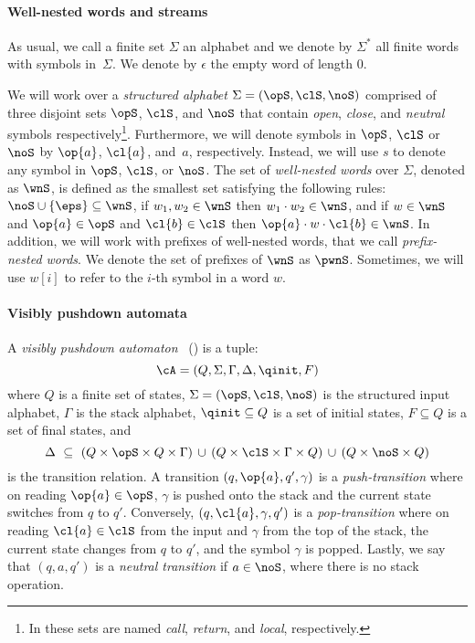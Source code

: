 \paragraph{Well-nested words and streams} As usual, we call a finite set $\Sigma$ an alphabet and we denote by $\Sigma^*$ all finite words with symbols in~$\Sigma$.  We denote by $\epsilon$ the empty word of length $0$.

We will work over a {\em structured alphabet} $\Sigma = (\opS, \clS, \noS)$ comprised of three disjoint sets $\opS$, $\clS$, and $\noS$ that contain {\it open}, {\it close}, and {\it neutral} symbols respectively\footnote{In \cite{AlurM04,FiliotRRST18} these sets are named \emph{call}, \emph{return}, and \emph{local}, respectively.}. 
Furthermore, we will denote symbols in $\opS$, $\clS$ or $\noS$ by $\op{a}$, $\cl{a}$, and~$a$, respectively.
Instead, we will use $s$ to denote any symbol in $\opS$, $\clS$, or $\noS$.
The set of {\em well-nested words}
over $\Sigma$, denoted as $\wnS$, is defined as the smallest set satisfying the following rules: 
$\noS \cup \{\eps\} \subseteq \wnS$,
if $w_1, w_2 \in \wnS$ then $w_1 \cdot w_2 \in \wnS$, and if $w \in \wnS$ and $\op{a} \in \opS$ and $\cl{b} \in \clS$ then $\op{a}\cdot w\cdot\cl{b} \in \wnS$. 
In addition, we will work with prefixes of well-nested words, that we call {\em prefix-nested words}. We denote the set of prefixes of $\wnS$ as $\pwnS$.
Sometimes, we will use $w[i]$ to refer to the $i$-th symbol in a word $w$.

\paragraph{Visibly pushdown automata} A \emph{visibly pushdown automaton}~\cite{AlurM04} (\vpa) is a tuple:
$$
\cA = (Q, \Sigma, \Gamma, \Delta, \qinit, F)
$$ 
where $Q$ is a finite set of states, $\Sigma = (\opS, \clS, \noS)$ is the structured input alphabet, $\Gamma$ is the stack alphabet, $\qinit \subseteq Q$ is a set of initial states, $F\subseteq Q$ is a set of final states, and
$$
\Delta \ \subseteq \ (Q\times\opS\times Q\times\Gamma) \,\cup \, (Q\times\clS\times\Gamma\times Q) \, \cup \, (Q\times\noS\times Q)
$$ 
is the transition relation.
A transition $(q,\op{a},q',\gamma)$ is a {\em push-transition} where on reading $\op{a}\in\opS$, $\gamma$ is pushed onto the stack and the current state switches from $q$ to $q'$. Conversely, $(q,\cl{a},\gamma,q')$ is a {\em pop-transition} where on reading $\cl{a}\in\clS$ from the input and $\gamma$ from the top of the stack, the current state changes from $q$ to $q'$, and the symbol $\gamma$ is popped. Lastly, we say that $(q,a,q')$ is a {\em neutral transition} if $a\in\noS$, where there is no stack operation.

